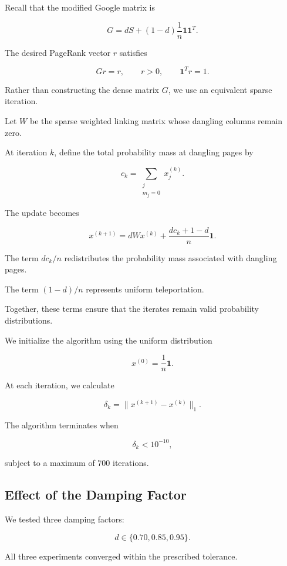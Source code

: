 \documentclass[11pt,a4paper]{article}
\theoremstyle{definition}
\theoremstyle{remark}
\begin{document}
Recall that the modified
Google matrix is

\[
G=dS+(1-d)\frac1n
\mathbf{1}\mathbf{1}^T.
\]

The desired PageRank vector
$r$ satisfies

\[
Gr=r,
\qquad
r>0,
\qquad
\mathbf{1}^Tr=1.
\]

Rather than constructing
the dense matrix $G$,
we use an equivalent
sparse iteration.

Let $W$ be the sparse
weighted linking matrix
whose dangling columns
remain zero.

At iteration $k$,
define the total probability
mass at dangling pages by

\[
c_k=
\sum_{\substack{j\\m_j=0}}
x_j^{(k)}.
\]

The update becomes

\begin{equation}
\boxed{
x^{(k+1)}
=
dWx^{(k)}
+
\frac{dc_k+1-d}{n}\mathbf{1}.
}
\label{eq:matlab_sparse_pagerank}
\end{equation}

The term $dc_k/n$
redistributes the probability
mass associated with dangling
pages.

The term $(1-d)/n$
represents uniform teleportation.

Together, these terms ensure
that the iterates remain
valid probability distributions.

We initialize the algorithm
using the uniform distribution

\[
x^{(0)}=\frac1n\mathbf{1}.
\]

At each iteration,
we calculate

\begin{equation}
\delta_k=
\|x^{(k+1)}-x^{(k)}\|_1.
\label{eq:matlab_stopping}
\end{equation}

The algorithm terminates when

\[
\delta_k<10^{-10},
\]

subject to a maximum
of $700$ iterations.

\subsection{Effect of the Damping Factor}

We tested three damping factors:

\[
d\in\{0.70,0.85,0.95\}.
\]

All three experiments converged
within the prescribed tolerance.
\end{document}
